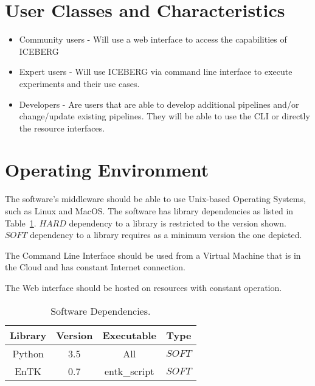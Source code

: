 \documentclass{scrreprt}
\begin{document}
\section{User Classes and Characteristics}
\iffalse
$<$Identify the various user classes that you anticipate will use this product.  
User classes may be differentiated based on frequency of use, subset of product 
functions used, technical expertise, security or privilege levels, educational 
level, or experience. Describe the pertinent characteristics of each user class.  
Certain requirements may pertain only to certain user classes. Distinguish the 
most important user classes for this product from those who are less important 
to satisfy.$>$
\fi
\begin{itemize}
	\item Community users - Will use a web interface to access the capabilities
	of ICEBERG
	\item Expert users - Will use ICEBERG via command line interface to execute 
	experiments and their use cases.
	\item Developers - Are users that are able to develop additional pipelines 
	and/or change/update existing pipelines. They will be able to use the CLI or 
	directly the resource interfaces.
\end{itemize}

\section{Operating Environment}
\iffalse
$<$Describe the environment in which the software will operate, including the 
hardware platform, operating system and versions, and any other software 
components or applications with which it must peacefully coexist.$>$
\fi
The software's middleware should be able to use Unix-based Operating Systems, such 
as Linux and MacOS. The software has library dependencies as listed in 
Table~\ref{tab:software_dependencies}. $HARD$ dependency to a library is restricted 
to the version shown. $SOFT$ dependency to a library requires as a minimum version 
the one depicted.

The Command Line Interface should be used from a Virtual Machine that is in the 
Cloud and has constant Internet connection.

The Web interface should be hosted on resources with constant operation.

\begin{table}
	\centering
	\begin{tabular}{|c|c|c|c|}
		\hline
		Library & Version & Executable & Type\\\hline
		Python        & 3.5      & All              & $SOFT$\\\hline
		EnTK          & 0.7      & entk\_script     & $SOFT$ \\\hline
		\hline
	\end{tabular}
	\caption{Software Dependencies.\label{tab:software_dependencies}}
\end{table}
\end{document}

